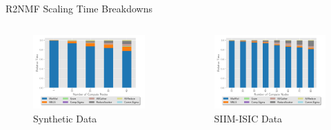 \documentclass{beamer}
\newcommand{\image}{SIIM-ISIC}
\begin{document}
\begin{frame}{R2NMF Scaling Time Breakdowns}
    \centering
    \begin{columns}
        \begin{column}{0.5\textwidth}
            \begin{figure}
            \includegraphics[width=\textwidth]{../plots/synthetic_rank2_strongscaling.pdf}
            \caption{Synthetic  Data}
            \end{figure}
        \end{column}
        \begin{column}{0.5\textwidth}
            \begin{figure}
            \includegraphics[width=\textwidth]{../plots/realworld_rank2_strongscaling.pdf}
            \caption{\image{} Data}
            \end{figure}
        \end{column}
    \end{columns}
\end{frame}
\end{document}
